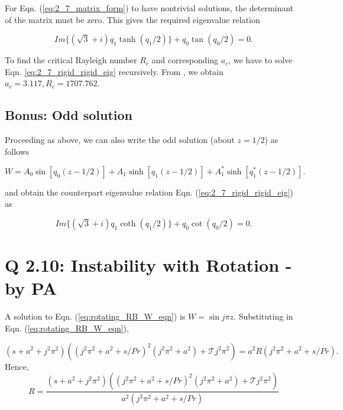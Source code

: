 For Eqn. (\ref{eq:2_7_matrix_form}) to have nontrivial solutions, the determinant of the matrix must be zero. This gives the required eigenvalue relation

\begin{equation}\label{eq:2_7_rigid_rigid_eig}
\boxed{
 Im \{(\sqrt{3} + i)q_{1} \tanh{(q_{1}/2)} \} + q_{0} \tan{(q_{0}/2)} = 0
 }.
\end{equation}

To find the critical Rayleigh number $R_{c}$ and corresponding $a_{c}$, we have to solve Eqn. \ref{eq:2_7_rigid_rigid_eig} recursively. From \cite{reid1958some}, we obtain $a_{c} = 3.117, R_{c} = 1707.762$. 
\subsection{Bonus: Odd solution}
Proceeding as above, we can also write the odd solution (about $z = 1/2$) as follows

\begin{equation}\label{eq:2_7_odd_soln}
\boxed{
 W = A_{0} \sin{[q_{0}(z-1/2)]} + A_{1} \sinh{[q_{1}(z-1/2)]} + A^{*}_{1} \sinh{[q^{*}_{1}(z-1/2)]}
 }.
\end{equation}

and obtain the counterpart eigenvalue relation Eqn. (\ref{eq:2_7_rigid_rigid_eig}) as


\begin{equation}\label{eq:2_7_rigid_rigid_eig_2}
\boxed{
 Im \{(\sqrt{3} + i)q_{1} \coth{(q_{1}/2)} \} + q_{0} \cot{(q_{0}/2)} = 0
 }.
\end{equation}
\section{Q 2.10: Instability with Rotation - by PA}
A solution to Eqn. (\ref{eq:rotating_RB_W_eqn}) is $W = \sin{j \pi z}$. Substituting in Eqn. (\ref{eq:rotating_RB_W_eqn}), 

\begin{equation}\label{eq:2_10_s_eqn}
 (s + a^{2} + j^{2}\pi^{2})\left( (j^{2}\pi^{2} + a^{2} + s/Pr)^{2}(j^{2}\pi^{2} + a^{2}) + \mathcal{T}j^{2}\pi^{2}\right) = a^{2}R(j^{2}\pi^{2} + a^{2} + s/Pr). 
\end{equation}
Hence, 
\begin{equation}
 R = \frac{(s + a^{2} + j^{2}\pi^{2})\left( (j^{2}\pi^{2} + a^{2} + s/Pr)^{2}(j^{2}\pi^{2} + a^{2}) + \mathcal{T}j^{2}\pi^{2}\right)}{a^{2} (j^{2}\pi^{2} + a^{2} + s/Pr)}
\end{equation}

